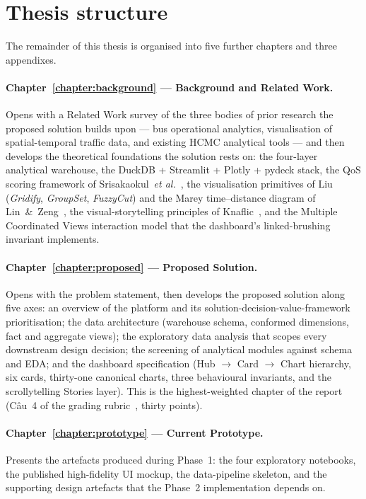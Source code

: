 \section{Thesis structure}
\label{sec:intro:structure}

The remainder of this thesis is organised into five further
chapters and three appendixes.

\paragraph{Chapter~\ref{chapter:background} --- Background and
Related Work.} Opens with a Related Work survey of the three
bodies of prior research the proposed solution builds upon ---
bus operational analytics, visualisation of spatial-temporal
traffic data, and existing HCMC analytical tools --- and then
develops the theoretical foundations the solution rests on: the
four-layer analytical warehouse, the DuckDB + Streamlit + Plotly
+ pydeck stack, the QoS scoring framework of
Srisakaokul~\textit{et al.}~\cite{srisakaokul2023}, the
visualisation primitives of Liu~\cite{liu2022}
(\emph{Gridify}, \emph{GroupSet}, \emph{FuzzyCut}) and the Marey
time--distance diagram of Lin~\&~Zeng~\cite{linzeng2014}, the
visual-storytelling principles of Knaflic~\cite{knaflic2015}, and
the Multiple Coordinated Views interaction model that the
dashboard's linked-brushing invariant implements.

\paragraph{Chapter~\ref{chapter:proposed} --- Proposed Solution.}
Opens with the problem statement, then develops the proposed
solution along five axes: an overview of the platform and its
solution-decision-value-framework prioritisation; the data
architecture (warehouse schema, conformed dimensions, fact and
aggregate views); the exploratory data analysis that scopes every
downstream design decision; the screening of analytical modules
against schema and EDA; and the dashboard specification (Hub
$\rightarrow$ Card $\rightarrow$ Chart hierarchy, six cards,
thirty-one canonical charts, three behavioural invariants, and
the scrollytelling Stories layer). This is the
highest-weighted chapter of the report (Câu~4 of the grading
rubric~\cite{rubric}, thirty points).

\paragraph{Chapter~\ref{chapter:prototype} --- Current Prototype.}
Presents the artefacts produced during Phase~1: the four
exploratory notebooks, the published high-fidelity UI mockup,
the data-pipeline skeleton, and the supporting design artefacts
that the Phase~2 implementation depends on.

